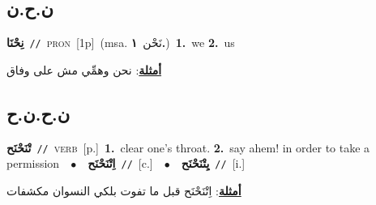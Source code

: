 \documentclass[10pt,a4paper,twoside]{article} %
\begin{document}
\begin{multicols}{2}
\vspace{-3mm}
\subsection*{\color{blue}\foreignlanguage{arabic}{ن.ح.ن}\color{blue}{ (ntws)}} 

{\setlength\topsep{0pt}\textbf{\foreignlanguage{arabic}{نِحْنَا}}\ {\color{gray}\texttt{//}\color{black}}\ \textsc{pron}\ [1p]\ \color{gray}(msa. \foreignlanguage{arabic}{نَحْن}~\foreignlanguage{arabic}{\textbf{١.}})\color{black}\ \textbf{1.}~we  \textbf{2.}~us\  \begin{flushright}\color{gray}\foreignlanguage{arabic}{\textbf{\underline{\foreignlanguage{arabic}{أمثلة}}}: نحن وهمِّي مش على وفاق}\end{flushright}\color{black}} \vspace{2mm}

\vspace{-3mm}
\subsection*{\color{blue}\foreignlanguage{arabic}{ن.ح.ن.ح}\color{blue}{}} 

{\setlength\topsep{0pt}\textbf{\foreignlanguage{arabic}{تْنَحْنَح}}\ {\color{gray}\texttt{//}\color{black}}\ \textsc{verb}\ [p.]\ \textbf{1.}~clear one's throat.  \textbf{2.}~say ahem! in order to take a permission\ \ $\bullet$\ \ \setlength\topsep{0pt}\textbf{\foreignlanguage{arabic}{اِتْنَحْنَح}}\ {\color{gray}\texttt{//}\color{black}}\ [c.]\ \ $\bullet$\ \ \setlength\topsep{0pt}\textbf{\foreignlanguage{arabic}{يِتْنَحْنَح}}\ {\color{gray}\texttt{//}\color{black}}\ [i.]\  \begin{flushright}\color{gray}\foreignlanguage{arabic}{\textbf{\underline{\foreignlanguage{arabic}{أمثلة}}}: اِتْنَحْنَح قبل ما تفوت بلكي النسوان مكشفات}\end{flushright}\color{black}} \vspace{2mm}


\end{multicols}
\end{document}
